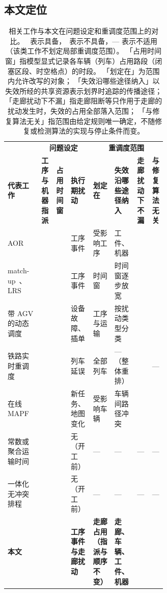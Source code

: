 \documentclass[manuscript,screen,review]{acmart}
\newcommand{\cmark}{\ding{51}}
\newcommand{\xmark}{\ding{55}}
\begin{document}
\subsection{本文定位}
\label{sec:rw_claim}

\begin{table}[t]
\centering
\caption{相关工作与本文在问题设定和重调度范围上的对比。
\cmark\ 表示具备，\xmark\ 表示不具备，— 表示不适用（该类工作不划定局部重调度范围）。
「占用时间窗」指模型显式记录各车辆（列车）占用路段（闭塞区段、时空格点）的时段。
「划定在」为范围内允许改写的对象；
「失效沿哪些途径纳入」以失效所经的共享资源表示划界时追踪的传播途径；
「走廊扰动下不漏」指走廊阻断等只作用于走廊的扰动发生时，失效的占用全部落入范围；
「与修复算法无关」指范围由给定规则唯一确定，不随修复或检测算法的实现与停止条件而变。}
\label{tab:position}
\small
\setlength{\tabcolsep}{3pt}
\begin{tabular}{@{}p{0.21\linewidth}ccp{0.14\linewidth}p{0.13\linewidth}p{0.14\linewidth}cc@{}}
\toprule
& \multicolumn{3}{c}{\textbf{问题设定}} & \multicolumn{4}{c}{\textbf{重调度范围}} \\
\cmidrule(lr){2-4}\cmidrule(l){5-8}
\textbf{代表工作} &
\makecell{\textbf{工序与}\\\textbf{机器指派}} &
\makecell{\textbf{占用}\\\textbf{时间窗}} &
\textbf{执行期扰动} &
\textbf{划定在} &
\textbf{失效沿哪些途径纳入} &
\makecell{\textbf{走廊扰动}\\\textbf{下不漏}} &
\makecell{\textbf{与修复}\\\textbf{算法无关}} \\
\midrule
AOR~\cite{subramaniam2003maor} &
\cmark & \xmark & 工序事件 & 受影响工序 & 工件、机器 & \xmark & \cmark \\
match-up~\cite{qiao2012single,salido2017rescheduling}、LRS~\cite{kuster2007local} &
\cmark & \xmark & 工序事件 & 时间窗 & 时间窗逐步放宽 & \xmark & \xmark \\
带 AGV 的动态调度~\cite{zhang2023energy,tang2026dynamic} &
\cmark & \xmark & 设备故障、插单 & 工序与运输 & 按扰动类型分类 & \xmark & \cmark \\
铁路实时重调度~\cite{mascis2002alternative,dariano2007branch} &
\xmark & \cmark & 列车延误 & 全部列车 & —（整体重排） & \cmark & — \\
在线 MAPF~\cite{svancara2019online,malka2024online} &
\xmark & \cmark & 新任务、地图变化 & 受影响车辆 & 车辆间路径冲突 & \cmark & \xmark \\
常数或聚合运输时间~\cite{meng2025cp,qin2026knowledge,jafarian2026integrated} &
\cmark & \xmark & 无（开工前） & — & — & — & — \\
一体化无冲突排程~\cite{vanos2026exact,sun2023integrated,li2026framework} &
\cmark & \cmark & 无（开工前） & — & — & — & — \\
\midrule
\textbf{本文} &
\cmark & \cmark & \textbf{工序事件与走廊扰动} & \textbf{走廊占用（指派与顺序不变）} & \textbf{走廊、车辆、工件、机器} & \cmark & \cmark \\
\bottomrule
\end{tabular}
\end{table}
\end{document}
